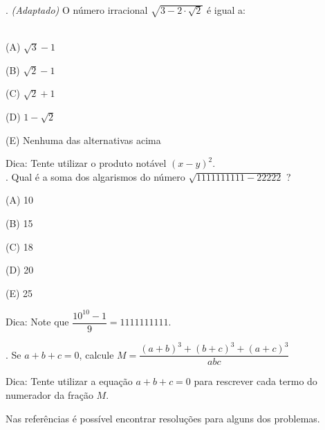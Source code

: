 \documentclass[a4paper, 12pt]{article}
\begin{document}
%

{}. \textit{(Adaptado)} O número irracional   \(\sqrt{3 - 2\cdot{\sqrt{2}}}\) é igual a: \\ \\

\begin{flushleft}

(A)   \(\sqrt{3} - 1\)
        
(B)   \(\sqrt{2} - 1\)
        
(C)   \(\sqrt{2} + 1\)
        
(D)   \(1 - \sqrt{2}\)
        
(E) Nenhuma das alternativas acima		

\end{flushleft}

\noindent Dica: Tente utilizar o produto notável \((x - y)^2\). \\

{}. Qual é a soma dos algarismos do número \(\sqrt{1111111111 - 22222}\) ?

\begin{flushleft}

(A)	10

(B)	15

(C)	18

(D)	20

(E)	25 

\end{flushleft}

\noindent Dica: Note que \(\dfrac{10^{10} - 1}{9} = 1111111111\). 


{}. Se \(a + b + c = 0\), calcule \(M = \dfrac{(a + b)^3 + (b + c)^3 + (a + c)^3}{abc}\) 


\noindent Dica: Tente utilizar a equação \(a + b + c = 0\) para rescrever cada termo do numerador da fração \(M\).

\noindent Nas referências é possível encontrar resoluções para alguns dos problemas.

    


\end{document}
